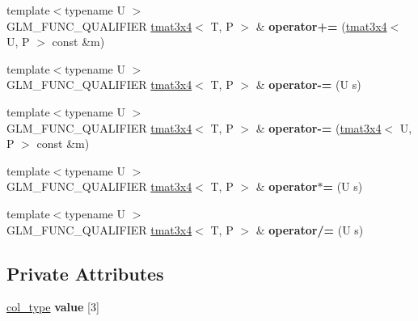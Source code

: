 \begin{DoxyCompactItemize}
\item 
{\footnotesize template$<$typename U $>$ }\\G\+L\+M\+\_\+\+F\+U\+N\+C\+\_\+\+Q\+U\+A\+L\+I\+F\+I\+ER \hyperlink{structglm_1_1detail_1_1tmat3x4}{tmat3x4}$<$ T, P $>$ \& {\bfseries operator+=} (\hyperlink{structglm_1_1detail_1_1tmat3x4}{tmat3x4}$<$ U, P $>$ const \&m)\hypertarget{structglm_1_1detail_1_1tmat3x4_a9c28e24ea115b67e1901be600e1acac3}{}\label{structglm_1_1detail_1_1tmat3x4_a9c28e24ea115b67e1901be600e1acac3}

\item 
{\footnotesize template$<$typename U $>$ }\\G\+L\+M\+\_\+\+F\+U\+N\+C\+\_\+\+Q\+U\+A\+L\+I\+F\+I\+ER \hyperlink{structglm_1_1detail_1_1tmat3x4}{tmat3x4}$<$ T, P $>$ \& {\bfseries operator-\/=} (U s)\hypertarget{structglm_1_1detail_1_1tmat3x4_a8803004a4da174ad2953f76aa6fb3aa5}{}\label{structglm_1_1detail_1_1tmat3x4_a8803004a4da174ad2953f76aa6fb3aa5}

\item 
{\footnotesize template$<$typename U $>$ }\\G\+L\+M\+\_\+\+F\+U\+N\+C\+\_\+\+Q\+U\+A\+L\+I\+F\+I\+ER \hyperlink{structglm_1_1detail_1_1tmat3x4}{tmat3x4}$<$ T, P $>$ \& {\bfseries operator-\/=} (\hyperlink{structglm_1_1detail_1_1tmat3x4}{tmat3x4}$<$ U, P $>$ const \&m)\hypertarget{structglm_1_1detail_1_1tmat3x4_ab293ffba697e138783137b5a0961afdf}{}\label{structglm_1_1detail_1_1tmat3x4_ab293ffba697e138783137b5a0961afdf}

\item 
{\footnotesize template$<$typename U $>$ }\\G\+L\+M\+\_\+\+F\+U\+N\+C\+\_\+\+Q\+U\+A\+L\+I\+F\+I\+ER \hyperlink{structglm_1_1detail_1_1tmat3x4}{tmat3x4}$<$ T, P $>$ \& {\bfseries operator$\ast$=} (U s)\hypertarget{structglm_1_1detail_1_1tmat3x4_a329a90caa5d646b47ad7af4fdd657e95}{}\label{structglm_1_1detail_1_1tmat3x4_a329a90caa5d646b47ad7af4fdd657e95}

\item 
{\footnotesize template$<$typename U $>$ }\\G\+L\+M\+\_\+\+F\+U\+N\+C\+\_\+\+Q\+U\+A\+L\+I\+F\+I\+ER \hyperlink{structglm_1_1detail_1_1tmat3x4}{tmat3x4}$<$ T, P $>$ \& {\bfseries operator/=} (U s)\hypertarget{structglm_1_1detail_1_1tmat3x4_aa6519a6c5e446e309ad26f609fdb9a74}{}\label{structglm_1_1detail_1_1tmat3x4_aa6519a6c5e446e309ad26f609fdb9a74}

\end{DoxyCompactItemize}
\subsection*{Private Attributes}
\begin{DoxyCompactItemize}
\item 
\hyperlink{structglm_1_1detail_1_1tvec4}{col\+\_\+type} {\bfseries value} \mbox{[}3\mbox{]}\hypertarget{structglm_1_1detail_1_1tmat3x4_a85d3c422b699a3653ac91d4e593e2fad}{}\label{structglm_1_1detail_1_1tmat3x4_a85d3c422b699a3653ac91d4e593e2fad}

\end{DoxyCompactItemize}


